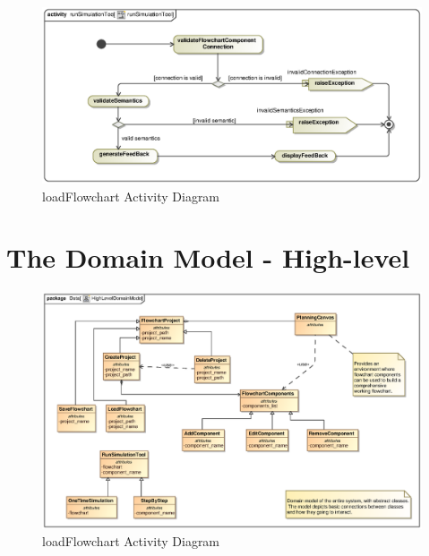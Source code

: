 \documentclass[11pt,a4paper,titlepage]{article}
\begin{document}
\begin{figure}[H]
  \centering
\includegraphics[width=500px]{runSimulationToolActivity.eps}
\caption{loadFlowchart Activity Diagram}
\end{figure}

\newpage
\section{The Domain Model - High-level}
\begin{figure}[H]
  \centering
\includegraphics[width=500px]{HighLevelDomainModel.eps}
\caption{loadFlowchart Activity Diagram}
\end{figure}
\end{document}

